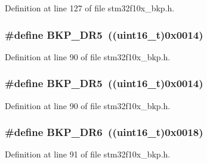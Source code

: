 Definition at line 127 of file stm32f10x\+\_\+bkp.\+h.

\subsubsection[{\texorpdfstring{B\+K\+P\+\_\+\+D\+R5}{BKP_DR5}}]{\setlength{\rightskip}{0pt plus 5cm}\#define B\+K\+P\+\_\+\+D\+R5~(({\bf uint16\+\_\+t})0x0014)}\hypertarget{group___data___backup___register_ga21191497b79eb37ab00a1564e060e5ca}{}\label{group___data___backup___register_ga21191497b79eb37ab00a1564e060e5ca}


Definition at line 90 of file stm32f10x\+\_\+bkp.\+h.

\subsubsection[{\texorpdfstring{B\+K\+P\+\_\+\+D\+R5}{BKP_DR5}}]{\setlength{\rightskip}{0pt plus 5cm}\#define B\+K\+P\+\_\+\+D\+R5~(({\bf uint16\+\_\+t})0x0014)}\hypertarget{group___data___backup___register_ga21191497b79eb37ab00a1564e060e5ca}{}\label{group___data___backup___register_ga21191497b79eb37ab00a1564e060e5ca}


Definition at line 90 of file stm32f10x\+\_\+bkp.\+h.

\subsubsection[{\texorpdfstring{B\+K\+P\+\_\+\+D\+R6}{BKP_DR6}}]{\setlength{\rightskip}{0pt plus 5cm}\#define B\+K\+P\+\_\+\+D\+R6~(({\bf uint16\+\_\+t})0x0018)}\hypertarget{group___data___backup___register_ga9d84a78d9c99d57844cfc557f4c047b4}{}\label{group___data___backup___register_ga9d84a78d9c99d57844cfc557f4c047b4}


Definition at line 91 of file stm32f10x\+\_\+bkp.\+h.

